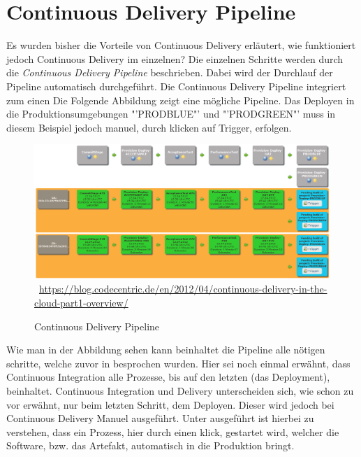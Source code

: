 \section{Continuous Delivery Pipeline}
\label{sec:Continuous Delivery Pipeline}
Es wurden bisher die Vorteile von Continuous Delivery erläutert, wie funktioniert jedoch Continuous Delivery im einzelnen? Die einzelnen Schritte werden durch die \textit{Continuous Delivery Pipeline} beschrieben. Dabei wird der Durchlauf der Pipeline automatisch durchgeführt. Die Continuous Delivery Pipeline integriert zum einen
Die Folgende Abbildung zeigt eine mögliche Pipeline. Das Deployen in die Produktionsumgebungen "'PRODBLUE"' und "'PRODGREEN"' muss in diesem Beispiel jedoch manuel, durch klicken auf Trigger, erfolgen.

\begin{figure}[htb]
    \centering 
    \includegraphics[width=\linewidth]{content/images/pipeline}\
    \quelle\url{https://blog.codecentric.de/en/2012/04/continuous-delivery-in-the-cloud-part1-overview/}
    \caption[Continuous Delivery Pipeline]{Continuous Delivery Pipeline\\}
    \label{fig:ContinuousDeliveryPipeline}  
\end{figure}\noindent 
Wie man in der Abbildung sehen kann beinhaltet die Pipeline alle nötigen schritte, welche zuvor in  besprochen wurden. Hier sei noch einmal erwähnt, dass Continuous Integration alle Prozesse, bis auf den letzten (das Deployment), beinhaltet. Continuous Integration und Delivery unterscheiden sich, wie schon zu vor erwähnt, nur beim letzten Schritt, dem Deployen. Dieser wird jedoch bei Continuous Delivery Manuel ausgeführt. Unter ausgeführt ist hierbei zu verstehen, dass ein Prozess, hier durch einen klick, gestartet wird, welcher die Software, bzw. das Artefakt, automatisch in die Produktion bringt.

